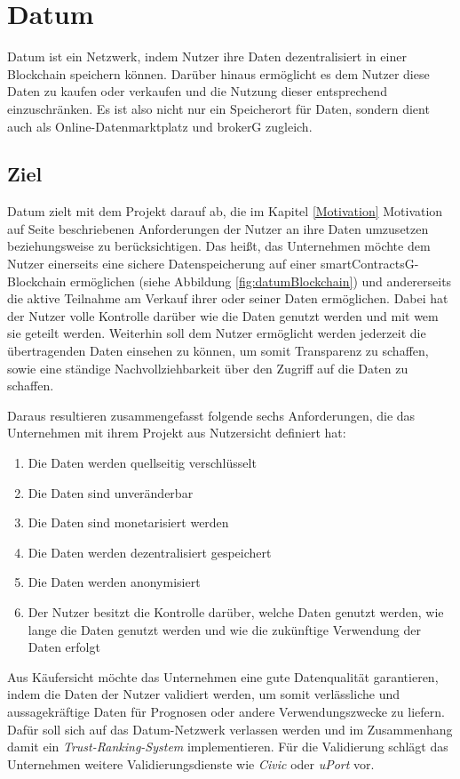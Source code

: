 \section{Datum}
Datum ist ein Netzwerk, indem Nutzer ihre Daten dezentralisiert in einer Blockchain speichern können. Darüber hinaus ermöglicht es dem Nutzer diese Daten zu kaufen oder verkaufen und die Nutzung dieser entsprechend einzuschränken. Es ist also nicht nur ein Speicherort für Daten, sondern dient auch als Online-Datenmarktplatz und \gls{brokerG} zugleich.

\subsection{Ziel}
Datum zielt mit dem Projekt darauf ab, die im Kapitel \ref{Motivation} Motivation auf Seite \pageref{Motivation} beschriebenen Anforderungen der Nutzer an ihre Daten umzusetzen beziehungsweise zu berücksichtigen. Das heißt, das Unternehmen möchte dem Nutzer einerseits eine sichere Datenspeicherung auf einer \gls{smartContractsG}-Blockchain ermöglichen (siehe Abbildung \ref{fig:datumBlockchain}) und andererseits die aktive Teilnahme am Verkauf ihrer oder seiner Daten ermöglichen. Dabei hat der Nutzer volle Kontrolle darüber wie die Daten genutzt werden und mit wem sie geteilt werden. Weiterhin soll dem Nutzer ermöglicht werden jederzeit die übertragenden Daten einsehen zu können, um somit Transparenz zu schaffen, sowie eine ständige Nachvollziehbarkeit über den Zugriff auf die Daten zu schaffen. \newline

\noindent Daraus resultieren zusammengefasst folgende sechs Anforderungen, die das Unternehmen mit ihrem Projekt aus Nutzersicht definiert hat:
\begin{enumerate}
	\item Die Daten werden quellseitig verschlüsselt
	\item Die Daten sind unveränderbar
	\item Die Daten sind monetarisiert werden
	\item Die Daten werden dezentralisiert gespeichert
	\item Die Daten werden anonymisiert
	\item Der Nutzer besitzt die Kontrolle darüber, welche Daten genutzt werden, wie lange die Daten genutzt werden und wie die zukünftige Verwendung der Daten erfolgt 
\end{enumerate}

\noindent Aus Käufersicht möchte das Unternehmen eine gute Datenqualität garantieren, indem die Daten der Nutzer validiert werden, um somit verlässliche und aussagekräftige Daten für Prognosen oder andere Verwendungszwecke zu liefern. Dafür soll sich auf das Datum-Netzwerk verlassen werden und im Zusammenhang damit ein \textit{Trust-Ranking-System} implementieren. Für die Validierung schlägt das Unternehmen weitere Validierungsdienste wie \textit{Civic} oder \textit{uPort} vor.

